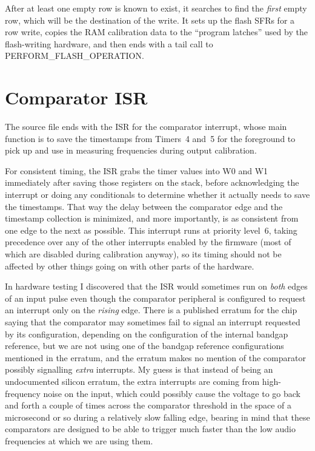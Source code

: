 After at least one empty row is known to exist, it searches to find the
\emph{first} empty row, which will be the destination of the write.  It sets
up the flash SFRs for a row write, copies the RAM calibration data to the
``program latches'' used by the flash-writing hardware, and then ends with a
tail call to PERFORM\_FLASH\_OPERATION.

\section{Comparator ISR}

The source file ends with the ISR for the comparator interrupt, whose main
function is to save the timestamps from Timers~4 and~5 for the foreground to
pick up and use in measuring frequencies during output calibration.

For consistent timing, the ISR grabs the timer values into W0 and W1
immediately after saving those registers on the stack, before acknowledging
the interrupt or doing any conditionals to determine whether it actually
needs to save the timestamps.  That way the delay between the comparator
edge and the timestamp collection is minimized, and more importantly, is as
consistent from one edge to the next as possible.  This interrupt runs at
priority level~6, taking precedence over any of the other interrupts enabled
by the firmware (most of which are disabled during calibration anyway), so
its timing should not be affected by other things going on with other parts
of the hardware.

In hardware testing I discovered that the ISR would sometimes run on
\emph{both} edges of an input pulse even though the comparator peripheral is
configured to request an interrupt only on the \emph{rising} edge.  There is
a published erratum for the chip saying that the comparator may sometimes
fail to signal an interrupt requested by its configuration, depending on the
configuration of the internal bandgap reference, but we are not using one of
the bandgap reference configurations mentioned in the erratum, and the
erratum makes no mention of the comparator possibly signalling \emph{extra}
interrupts.  My guess is that instead of being an undocumented silicon
erratum, the extra interrupts are coming from high-frequency noise on the
input, which could possibly cause the voltage to go back and forth a couple
of times across the comparator threshold in the space of a microsecond or so
during a relatively slow falling edge, bearing in mind that these
comparators are designed to be able to trigger much faster than the low
audio frequencies at which we are using them.

